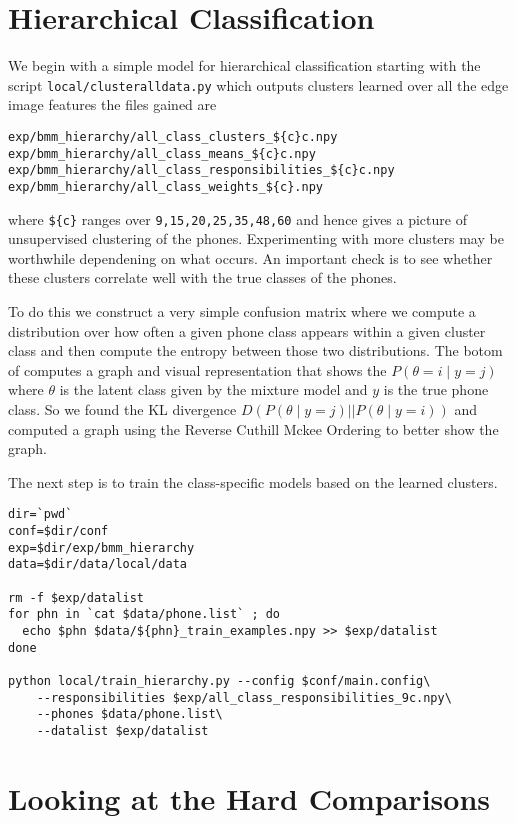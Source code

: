 \documentclass{article}
\begin{document}
\section{Hierarchical Classification}

We begin with a simple model for hierarchical classification
starting with the script \texttt{local/clusteralldata.py}
which outputs clusters learned over all the edge image features
the files gained are
\begin{verbatim}
exp/bmm_hierarchy/all_class_clusters_${c}c.npy
exp/bmm_hierarchy/all_class_means_${c}c.npy
exp/bmm_hierarchy/all_class_responsibilities_${c}c.npy
exp/bmm_hierarchy/all_class_weights_${c}.npy
\end{verbatim}
where \texttt{\$\{c\}} ranges over \texttt{9,15,20,25,35,48,60}
and hence gives a picture of unsupervised clustering of the phones.
Experimenting with more clusters may be worthwhile dependening
on what occurs.  An important check is to see whether these clusters
correlate well with the true classes of the phones.

To do this we construct a very simple confusion matrix where we compute a distribution over how often a given phone class appears within
a given cluster class and then compute the entropy between those
two distributions. The botom of 
computes a graph and visual representation that shows the 
$P(\theta=i\mid y=j)$
where $\theta$ is the latent class given by the mixture model
and $y$ is the true phone class.  So we found the KL divergence
$D(P(\theta\mid y=j) || P(\theta\mid y=i))$ and computed a graph
using the Reverse Cuthill Mckee Ordering to better show the 
graph.

The next step is to train the class-specific models based on the
learned clusters.
\begin{verbatim}
dir=`pwd`
conf=$dir/conf
exp=$dir/exp/bmm_hierarchy
data=$dir/data/local/data

rm -f $exp/datalist
for phn in `cat $data/phone.list` ; do
  echo $phn $data/${phn}_train_examples.npy >> $exp/datalist
done

python local/train_hierarchy.py --config $conf/main.config\
    --responsibilities $exp/all_class_responsibilities_9c.npy\
    --phones $data/phone.list\
    --datalist $exp/datalist

\end{verbatim}

\section{Looking at the Hard Comparisons}
\end{document}
